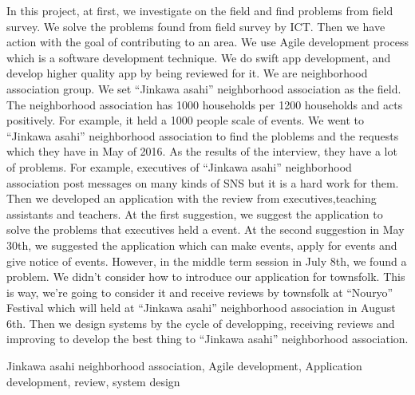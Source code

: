 \begin{eabstract}
In this project, at first, we investigate on the field and find problems from field survey. We solve the problems found from field survey by ICT. Then we have action with the goal of contributing to an area. We use Agile development process which is a software development technique. We do swift app development, and develop higher quality app by being reviewed for it.
We are neighborhood association group. We set ``Jinkawa asahi'' neighborhood association as the field.
The neighborhood association has 1000 households per 1200 households and acts positively. For example, it held a 1000 people scale of events. We went to ``Jinkawa asahi'' neighborhood association to find the ploblems and the requests which they have in May of 2016. As the results of the interview, they have a lot of problems. For example, executives of ``Jinkawa asahi'' neighborhood association post messages on many kinds of SNS but it is a hard work for them. Then we developed an application with the review from executives,teaching assistants and teachers. At the first suggestion, we suggest the application to solve the problems that executives held a event. At the second suggestion in May 30th, we suggested the application which can make events, apply for events and give notice of events. However, in the middle term session in July 8th, we found a problem. We didn't consider how to introduce our application for townsfolk. This is way, we're going to consider it and receive reviews by townsfolk at ``Nouryo'' Festival which will held at ``Jinkawa asahi'' neighborhood association in August 6th. Then we design systems by the cycle of developping, receiving reviews and improving to develop the best thing to ``Jinkawa asahi'' neighborhood association.
\begin{ekeyword}
Jinkawa asahi neighborhood association, Agile development, Application development, review, system design
\end{ekeyword}
\end{eabstract}
